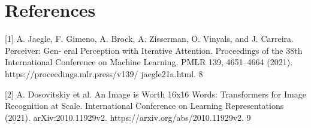 \documentclass[11pt]{article}
\begin{document}
\section*{References}

[1] A. Jaegle, F. Gimeno, A. Brock, A. Zisserman, O. Vinyals, and J. Carreira. Perceiver: Gen-
eral Perception with Iterative Attention. Proceedings of the 38th International Conference on
Machine Learning, PMLR 139, 4651–4664 (2021). https://proceedings.mlr.press/v139/
jaegle21a.html.
8

[2] A. Dosovitskiy et al. An Image is Worth 16x16 Words: Transformers for Image Recognition
at Scale. International Conference on Learning Representations (2021). arXiv:2010.11929v2.
https://arxiv.org/abs/2010.11929v2.
9
\end{document}
